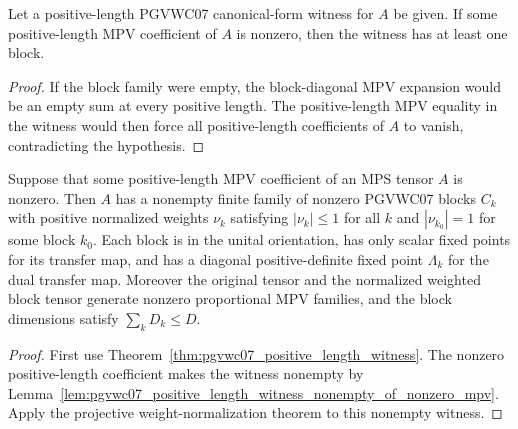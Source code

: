 \begin{lemma}%
    \label{lem:pgvwc07_positive_length_witness_nonempty_of_nonzero_mpv}
    \leanok
    Let a positive-length PGVWC07 canonical-form witness for $A$ be given.
    If some positive-length MPV coefficient of $A$ is nonzero, then the
    witness has at least one block.
\end{lemma}
\begin{proof}\leanok
    If the block family were empty, the block-diagonal MPV expansion would be
    an empty sum at every positive length. The positive-length MPV equality in
    the witness would then force all positive-length coefficients of $A$ to
    vanish, contradicting the hypothesis.
\end{proof}

\begin{theorem}%
    \label{thm:pgvwc07_nonzero_normalized_projective_form}
    \leanok
    Suppose that some positive-length MPV coefficient of an MPS tensor $A$ is
    nonzero. Then $A$ has a nonempty finite family of nonzero PGVWC07 blocks
    $C_k$ with positive normalized weights $\nu_k$ satisfying
    $|\nu_k|\leq 1$ for all $k$ and $|\nu_{k_0}|=1$ for some block $k_0$.
    Each block is in the unital orientation, has only scalar fixed points for
    its transfer map, and has a diagonal positive-definite fixed point
    $\Lambda_k$ for the dual transfer map. Moreover the original tensor and
    the normalized weighted block tensor generate nonzero proportional MPV
    families, and the block dimensions satisfy $\sum_k D_k\leq D$.
\end{theorem}
\begin{proof}\leanok
    First use Theorem~\ref{thm:pgvwc07_positive_length_witness}. The nonzero
    positive-length coefficient makes the witness nonempty by
    Lemma~\ref{lem:pgvwc07_positive_length_witness_nonempty_of_nonzero_mpv}.
    Apply the projective weight-normalization theorem to this nonempty witness.
\end{proof}

